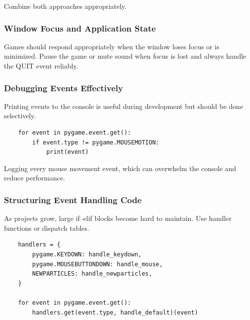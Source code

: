 Combine both approaches appropriately. 

\subsubsection{Window Focus and Application State}

\begin{hintbox}
	Games should respond appropriately when the window loses focus or is minimized. Pause the game or mute sound when focus is lost and always handle the QUIT event reliably.
\end{hintbox}

\subsubsection{Debugging Events Effectively}

Printing events to the console is useful during development but should be done selectively.

\lstset{firstnumber=1}
\begin{lstlisting}
	for event in pygame.event.get():
		if event.type != pygame.MOUSEMOTION:
			print(event)
\end{lstlisting}			

\begin{warningbox}
	Logging every mouse movement event, which can overwhelm the console and reduce performance.
\end{warningbox}


\subsubsection{Structuring Event Handling Code}

\begin{hintbox}
	As projects grow, large if–elif blocks become hard to maintain. Use handler functions or dispatch tables.
\end{hintbox}

\lstset{firstnumber=1}
\begin{lstlisting}
	handlers = {
		pygame.KEYDOWN: handle_keydown,
		pygame.MOUSEBUTTONDOWN: handle_mouse,
		NEWPARTICLES: handle_newparticles,
	}

	for event in pygame.event.get():
		handlers.get(event.type, handle_default)(event)
\end{lstlisting}

